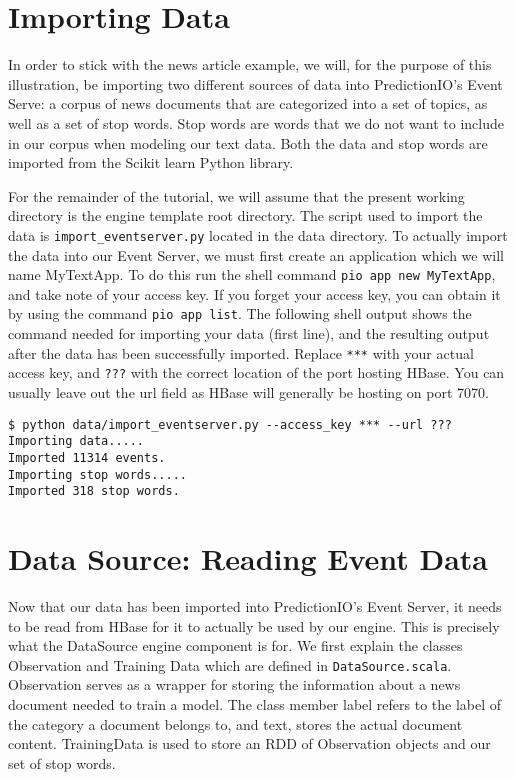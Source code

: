 \documentclass[a4paper,12pt]{article}
\renewcommand{\tt}[1]{\texttt{#1}}
\newcommand{\3}{\left}
\newcommand{\4}{\right}
\renewcommand{\-}[1]{{}^{-#1}}
\begin{document}
\section*{Importing Data}

In order to stick with the news article example, we will, for the purpose of this illustration, be importing two different sources of data into PredictionIO's Event Serve: a corpus of news documents that are categorized into a set of topics, as well as a set of stop words. Stop words are words that we do not want to include in our corpus when modeling our text data. Both the data and stop words are imported from the Scikit learn Python library. 

For the remainder of the tutorial, we will assume that the present working directory is the engine template root directory. The script used to import the data is \tt{import\_eventserver.py} located in the data directory. To actually import the data into our Event Server, we must first create an application which we will name MyTextApp. To do this run the shell command \tt{pio app new MyTextApp}, and take note of your access key. If you forget your access key, you can obtain it by using the command \tt{pio app list}. The following shell output shows the command needed for importing your data (first line), and the resulting output after the data has been successfully imported. Replace \tt{***} with your actual access key, and \tt{???} with the correct location of the port hosting HBase. You can usually leave out the url field as HBase will generally be hosting on port 7070.

\begin{verbatim}
$ python data/import_eventserver.py --access_key *** --url ???
Importing data.....
Imported 11314 events.
Importing stop words.....
Imported 318 stop words.
 \end{verbatim}

\section*{Data Source: Reading Event Data}

Now that our data has been imported into PredictionIO's Event Server, it needs to be read from HBase for it to actually be used by our engine. This is precisely what the DataSource engine component is for. We first explain the classes Observation and Training Data which are defined in \tt{DataSource.scala}. Observation serves as a wrapper for storing the information about a news document needed to train a model. The class member label refers to the label of the category a document belongs to, and text, stores the actual document content. TrainingData is used to store an RDD of Observation objects and our set of stop words. 
\end{document}
